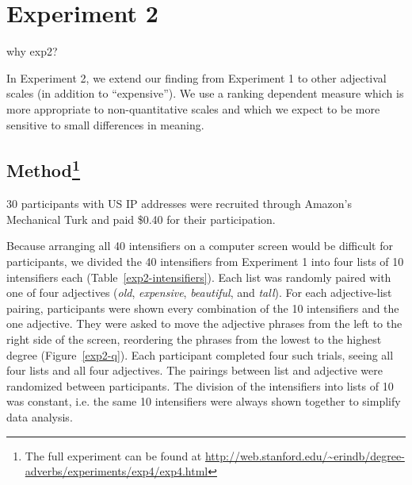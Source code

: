 \documentclass[10pt,letterpaper]{article}
\newcommand{\w}[1]{\emph{#1}}
\newcommand{\todo}[1]{{\color{red}#1}}
\begin{document}
\section{Experiment 2}



\todo{why exp2?}


In Experiment 2, we extend our finding from Experiment 1 to other adjectival scales (in addition to ``expensive''). We use a ranking dependent measure which is more appropriate to non-quantitative scales and which we expect to be more sensitive to small differences in meaning.

\subsection{Method\footnote{The full experiment can be found at \url{http://web.stanford.edu/~erindb/degree-adverbs/experiments/exp4/exp4.html}}}

30 participants with US IP addresses were recruited through Amazon's Mechanical Turk and paid \$0.40 for their participation.

Because arranging all 40 intensifiers on a computer screen would be difficult for participants, we divided the 40 intensifiers from Experiment 1 into four lists of 10 intensifiers each (Table~\ref{exp2-intensifiers}).
Each list was randomly paired with one of four adjectives (\w{old}, \w{expensive}, \w{beautiful}, and \w{tall}).
For each adjective-list pairing, participants were shown every combination of the 10 intensifiers and the one adjective.
They were asked to move the adjective phrases from the left to the right side of the screen, reordering the phrases from the lowest to the highest degree (Figure~\ref{exp2-q}).
Each participant completed four such trials, seeing all four lists and all four adjectives.
The pairings between list and adjective were randomized between participants.
The division of the intensifiers into lists of 10 was constant, i.e. the same 10 intensifiers were always shown together to simplify data analysis.
\end{document}
